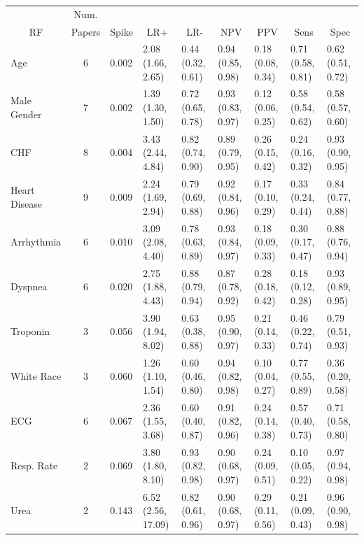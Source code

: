 \documentclass[AMA,STIX1COL]{WileyNJD-v2}
\begin{document}
\begin{table}
\setlength{\tabcolsep}{3.5pt}
\centering
\begin{tabular}{lclllllll}
  \toprule
            &   \multicolumn{1}{c}{Num.}      &	&	   &	     &		&	    &		& \\
 \multicolumn{1}{c}{RF} & \multicolumn{1}{c}{Papers} & \multicolumn{1}{c}{Spike} & \multicolumn{1}{c}{LR+} & \multicolumn{1}{c}{LR-} & \multicolumn{1}{c}{NPV} & \multicolumn{1}{c}{PPV} & \multicolumn{1}{c}{Sens} & \multicolumn{1}{c}{Spec} \\ 
  \toprule
Age &    6 & 0.002 & 2.08 (1.66, 2.65) & 0.44 (0.32, 0.61) & 0.94 (0.85, 0.98) & 0.18 (0.08, 0.34) & 0.71 (0.58, 0.81) & 0.62 (0.51, 0.72) \\ 
  Male Gender &    7 & 0.002 & 1.39 (1.30, 1.50) & 0.72 (0.65, 0.78) & 0.93 (0.83, 0.97) & 0.12 (0.06, 0.25) & 0.58 (0.54, 0.62) & 0.58 (0.57, 0.60) \\ 
  CHF &    8 & 0.004 & 3.43 (2.44, 4.84) & 0.82 (0.74, 0.90) & 0.89 (0.79, 0.95) & 0.26 (0.15, 0.42) & 0.24 (0.16, 0.32) & 0.93 (0.90, 0.95) \\ 
  Heart Disease &    9 & 0.009 & 2.24 (1.69, 2.94) & 0.79 (0.69, 0.88) & 0.92 (0.84, 0.96) & 0.17 (0.10, 0.29) & 0.33 (0.24, 0.44) & 0.84 (0.77, 0.88) \\ 
  Arrhythmia &    6 & 0.010 & 3.09 (2.08, 4.40) & 0.78 (0.63, 0.89) & 0.93 (0.84, 0.97) & 0.18 (0.09, 0.33) & 0.30 (0.17, 0.47) & 0.88 (0.76, 0.94) \\ 
  Dyspnea &    6 & 0.020 & 2.75 (1.88, 4.43) & 0.88 (0.79, 0.94) & 0.87 (0.78, 0.92) & 0.28 (0.18, 0.42) & 0.18 (0.12, 0.28) & 0.93 (0.89, 0.95) \\ 
  Troponin &    3 & 0.056 & 3.90 (1.94, 8.02) & 0.63 (0.38, 0.88) & 0.95 (0.90, 0.97) & 0.21 (0.14, 0.33) & 0.46 (0.22, 0.74) & 0.79 (0.51, 0.93) \\ 
  White Race &    3 & 0.060 & 1.26 (1.10, 1.54) & 0.60 (0.46, 0.80) & 0.94 (0.82, 0.98) & 0.10 (0.04, 0.27) & 0.77 (0.55, 0.89) & 0.36 (0.20, 0.58) \\ 
  ECG &    6 & 0.067 & 2.36 (1.55, 3.68) & 0.60 (0.40, 0.87) & 0.91 (0.82, 0.96) & 0.24 (0.14, 0.38) & 0.57 (0.40, 0.73) & 0.71 (0.58, 0.80) \\ 
  Resp. Rate &    2 & 0.069 & 3.80 (1.80, 8.10) & 0.93 (0.82, 0.98) & 0.90 (0.68, 0.97) & 0.24 (0.09, 0.51) & 0.10 (0.05, 0.22) & 0.97 (0.94, 0.98) \\ 
  Urea &    2 & 0.143 & 6.52 (2.56, 17.09) & 0.82 (0.61, 0.96) & 0.90 (0.68, 0.97) & 0.29 (0.11, 0.56) & 0.21 (0.09, 0.43) & 0.96 (0.90, 0.98) \\ 

\end{tabular}
\end{table}
\end{document}

